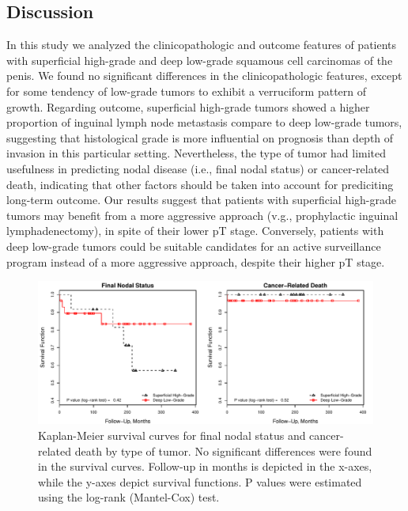 \documentclass[11pt,letterpaper]{article}\usepackage[]{graphicx}\usepackage[]{color}
\makeatletter
\def\maxwidth{ %
  \ifdim\Gin@nat@width>\linewidth
    \linewidth
  \else
    \Gin@nat@width
  \fi
}
\newenvironment{knitrout}{}{} %
\makeatother
\begin{document}
\begin{multicols}{2}
\section*{Discussion}
In this study we analyzed the clinicopathologic and outcome features of patients with superficial high-grade and deep low-grade squamous cell carcinomas of the penis. We found no significant differences in the clinicopathologic features, except for some tendency of low-grade tumors to exhibit a verruciform pattern of growth. Regarding outcome, superficial high-grade tumors showed a higher proportion of inguinal lymph node metastasis compare to deep low-grade tumors, suggesting that histological grade is more influential on prognosis than depth of invasion in this particular setting. Nevertheless, the type of tumor had limited usefulness in predicting nodal disease (i.e., final nodal status) or cancer-related death, indicating that other factors should be taken into account for prediciting long-term outcome. Our results suggest that patients with superficial high-grade tumors may benefit from a more aggressive approach (v.g., prophylactic inguinal lymphadenectomy), in spite of their lower pT stage. Conversely, patients with deep low-grade tumors could be suitable candidates for an active surveillance program instead of a more aggressive approach, despite their higher pT stage.

\begin{figure}
\centering
\begin{knitrout}
\color{fgcolor}
\includegraphics[width=\maxwidth]{figure/Survival-1} 

\end{knitrout}
        \caption{Kaplan-Meier survival curves for final nodal status and cancer-related death by type of tumor. No significant differences were found in the survival curves. Follow-up in months is depicted in the x-axes, while the y-axes depict survival functions. P values were estimated using the log-rank (Mantel-Cox) test.}
        \label{Fig_Survival}
\end{figure}


\end{multicols}
\end{document}
